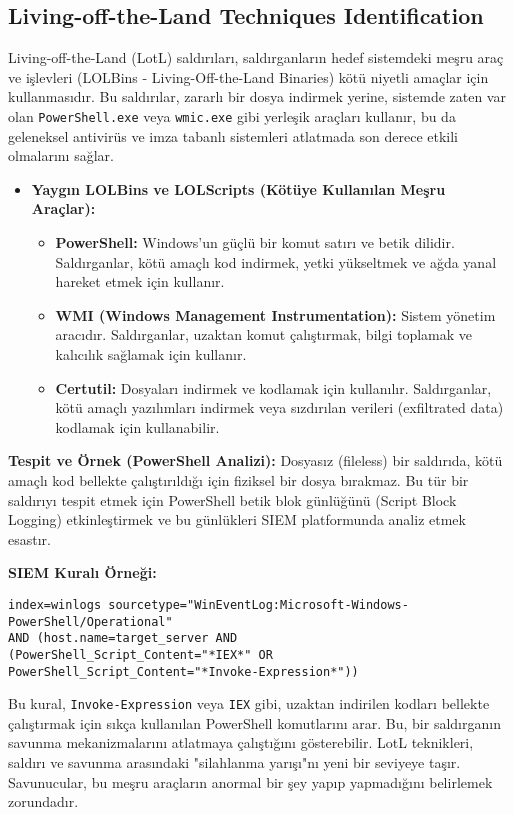 \subsection{Living-off-the-Land Techniques Identification}

Living-off-the-Land (LotL) saldırıları, saldırganların hedef sistemdeki meşru araç ve işlevleri (LOLBins - Living-Off-the-Land Binaries) kötü niyetli amaçlar için kullanmasıdır. Bu saldırılar, zararlı bir dosya indirmek yerine, sistemde zaten var olan \texttt{PowerShell.exe} veya \texttt{wmic.exe} gibi yerleşik araçları kullanır, bu da geleneksel antivirüs ve imza tabanlı sistemleri atlatmada son derece etkili olmalarını sağlar.

\begin{itemize}
    \item \textbf{Yaygın LOLBins ve LOLScripts (Kötüye Kullanılan Meşru Araçlar):}
    \begin{itemize}
        \item \textbf{PowerShell:} Windows'un güçlü bir komut satırı ve betik dilidir. Saldırganlar, kötü amaçlı kod indirmek, yetki yükseltmek ve ağda yanal hareket etmek için kullanır.
        \item \textbf{WMI (Windows Management Instrumentation):} Sistem yönetim aracıdır. Saldırganlar, uzaktan komut çalıştırmak, bilgi toplamak ve kalıcılık sağlamak için kullanır.
        \item \textbf{Certutil:} Dosyaları indirmek ve kodlamak için kullanılır. Saldırganlar, kötü amaçlı yazılımları indirmek veya sızdırılan verileri (exfiltrated data) kodlamak için kullanabilir.
    \end{itemize}
\end{itemize}

\textbf{Tespit ve Örnek (PowerShell Analizi):}
Dosyasız (fileless) bir saldırıda, kötü amaçlı kod bellekte çalıştırıldığı için fiziksel bir dosya bırakmaz. Bu tür bir saldırıyı tespit etmek için PowerShell betik blok günlüğünü (Script Block Logging) etkinleştirmek ve bu günlükleri SIEM platformunda analiz etmek esastır.

\textbf{SIEM Kuralı Örneği:}
\begin{verbatim}
index=winlogs sourcetype="WinEventLog:Microsoft-Windows-PowerShell/Operational" 
AND (host.name=target_server AND 
(PowerShell_Script_Content="*IEX*" OR PowerShell_Script_Content="*Invoke-Expression*"))
\end{verbatim}

Bu kural, \texttt{Invoke-Expression} veya \texttt{IEX} gibi, uzaktan indirilen kodları bellekte çalıştırmak için sıkça kullanılan PowerShell komutlarını arar. Bu, bir saldırganın savunma mekanizmalarını atlatmaya çalıştığını gösterebilir. LotL teknikleri, saldırı ve savunma arasındaki "silahlanma yarışı"nı yeni bir seviyeye taşır. Savunucular, bu meşru araçların anormal bir şey yapıp yapmadığını belirlemek zorundadır.

